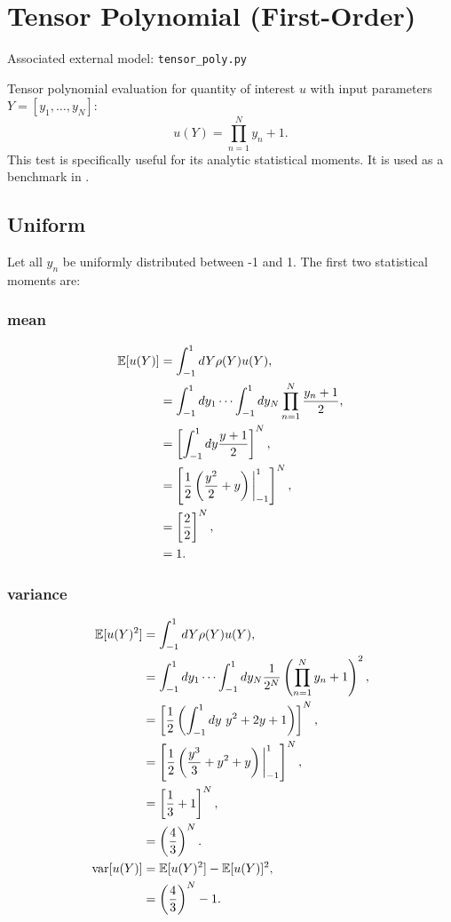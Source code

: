 \section{Tensor Polynomial (First-Order)}
Associated external model: \texttt{tensor\_poly.py}

Tensor polynomial evaluation for quantity of interest $u$ with input parameters $Y=[y_1,\ldots,y_N]$:
\begin{equation}
u(Y) = \prod_{n=1}^N y_n+1.
\end{equation}
This test is specifically useful for its analytic statistical moments.  It is used as a benchmark in
\cite{ayreseaton2015}.

\subsection{Uniform}
Let all $y_n$ be uniformly distributed between -1 and 1.  The first two statistical moments are:

\subsubsection{mean}
\begin{align}
\mathbb{E}[ u(Y)] &=\int_{-1}^1 dY \rho(Y)u(Y), \notag \\
  &=\int_{-1}^1 dy_1\cdots\int_{-1}^1 dy_N \prod_{n=1}^N \frac{y_n+1}{2},\notag \\
  &=\left[ \int_{-1}^1 dy \frac{y+1}{2}\right]^N,\\
  &=\left[\frac{1}{2}\left(\frac{y^2}{2}+y\right)\bigg|_{-1}^1\right]^N, \notag \\
  &=\left[\frac{2}{2}\right]^N, \notag \\
  &=1. \notag 
\end{align}

\subsubsection{variance}
\begin{align}
\mathbb{E}[ u(Y)^2] &= \int_{-1}^1 dY \rho(Y)u(Y),\notag \\
  &=\int_{-1}^1 dy_1\cdots\int_{-1}^1 dy_N \frac{1}{2^N} \left(\prod_{n=1}^N y_n+1\right)^2,\notag \\
  &=\left[\frac{1}{2}\left(\int_{-1}^1 dy\ y^2+2y+1 \right)\right]^N,\\
  &=\left[\frac{1}{2}\left(\frac{y^3}{3}+y^2+y \right)\bigg|_{-1}^1 \right]^N, \notag \\
  &=\left[\frac{1}{3}+1\right]^N, \notag \\
  &=\left(\frac{4}{3}\right)^N.\notag \\
\text{var}[u(Y)] &= \mathbb{E}[ u(Y)^2]-\mathbb{E}[ u(Y)]^2,\notag \\
  &= \left(\frac{4}{3}\right)^N-1.
\end{align}

